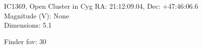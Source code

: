 \begin{block}{IC1369, Open Cluster in Cyg}
    RA: 21:12:09.04, Dec: +47:46:06.6 \\ 
    Magnitude (V): None \\ 
    Dimensions: 5.1 

    Finder fov: 30 

     
\end{block}